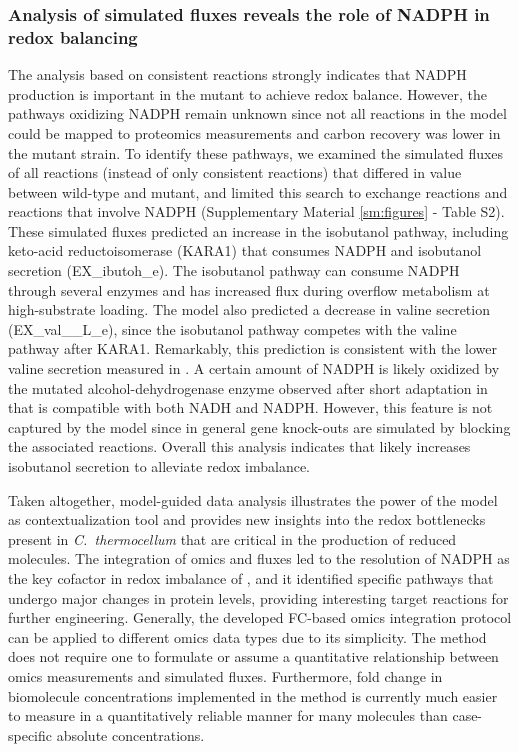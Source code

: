 \subsubsection{Analysis of simulated fluxes reveals the role of NADPH in redox balancing}
The analysis based on consistent reactions strongly indicates that NADPH production is important in the mutant to achieve redox balance.
However, the pathways oxidizing NADPH remain unknown since not all reactions in the model could be mapped to proteomics measurements and carbon recovery was lower in the mutant strain.\citep{thompson2015} To identify these pathways, we examined the simulated fluxes of all reactions (instead of only consistent reactions) that differed in value between wild-type and mutant, and limited this search to exchange reactions and reactions that involve NADPH (Supplementary Material \ref{sm:figures} - Table S2).
These simulated fluxes predicted an increase in the isobutanol pathway, including keto-acid reductoisomerase (KARA1) that consumes NADPH and isobutanol secretion (EX\_ibutoh\_e).
The isobutanol pathway can consume NADPH through several enzymes\citep{lin2015} and has increased flux during overflow metabolism at high-substrate loading.\citep{holwerda2014,thompson2017}
The model also predicted a decrease in valine secretion (EX\_val\_\_L\_e), since the isobutanol pathway competes with the valine pathway after KARA1.
Remarkably, this prediction is consistent with the lower valine secretion measured in .\citep{biswas2017} %
A certain amount of NADPH is likely oxidized by the mutated alcohol-dehydrogenase enzyme observed after short adaptation in  that is compatible with both NADH and NADPH.\citep{biswas2015} However, this feature is not captured by the model since in general gene knock-outs are simulated by blocking the associated reactions.
Overall this analysis indicates that  likely increases isobutanol secretion to alleviate redox imbalance.


Taken altogether, model-guided data analysis illustrates the power of the model as contextualization tool and provides new insights into the redox bottlenecks present in \textit{C.~thermocellum} that are critical in the production of reduced molecules.
The integration of omics and fluxes led to the resolution of NADPH as the key cofactor in redox imbalance of , and it identified specific pathways that undergo major changes in protein levels, providing interesting target reactions for further engineering.
Generally, the developed FC-based omics integration protocol can be applied to different omics data types due to its simplicity. The method does not require one to formulate or assume a quantitative relationship between omics measurements and simulated fluxes. Furthermore, fold change in biomolecule concentrations implemented in the method is currently much easier to measure in a quantitatively reliable manner for many molecules than case-specific absolute concentrations.


